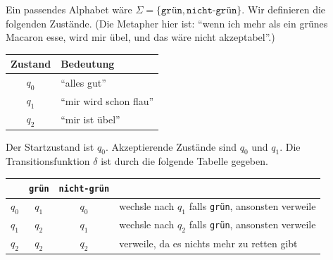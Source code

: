 \begin{Bsp}
\begin{center}
\end{center}
Ein passendes Alphabet wäre $\Sigma = \{\texttt{grün} , \texttt{nicht-grün} \}$.
Wir definieren die folgenden Zustände.
(Die Metapher hier ist: "`wenn ich mehr als ein grünes Macaron esse, wird mir übel, und das wäre nicht akzeptabel"'.)
\begin{center}
\begin{tabular}{cl}
  Zustand & Bedeutung \\
  \hline
  $q_0$& "`alles gut"' \\
  $q_1$& "`mir wird schon flau"' \\
  $q_2$& "`mir ist übel"'
\end{tabular}
\end{center}
Der Startzustand ist $q_0$.
Akzeptierende Zustände sind $q_0$ und $q_1$.
Die Transitionsfunktion $\delta$ ist durch die folgende Tabelle gegeben.
\begin{center}
\begin{tabular}{cccl}
  &\texttt{grün} & \texttt{nicht-grün} \\
  \hline
  $q_0$ & $q_1$ & $q_0$ & wechsle nach $q_1$ falls \texttt{grün}, ansonsten verweile \\
  $q_1$ & $q_2$ & $q_1$ & wechsle nach $q_2$ falls \texttt{grün}, ansonsten verweile \\
  $q_2$  & $q_2$ & $q_2$ & verweile, da es nichts mehr zu retten gibt
\qedhere
\end{tabular}
\end{center}
\end{Bsp}


